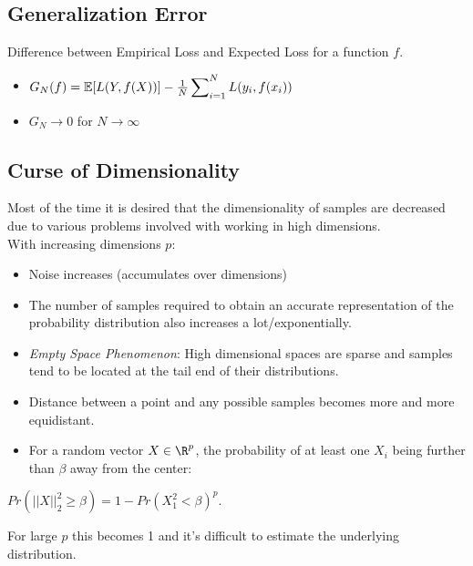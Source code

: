 \documentclass[english]{latex4ei/latex4ei_sheet}
\begin{document}
\begin{sectionbox}

\subsection{Generalization Error}
Difference between Empirical Loss and Expected Loss for a function $f$.
\begin{itemize}
    \item $G_N(f)=\mathbb{E}[L(Y,f(X))]-\frac{1}{N}\sideset{}{_{i=1}^N}\sum L(y_i,f(x_i))$
    \item $G_N \to 0$ for $N\to \infty$
\end{itemize}

\subsection{Curse of Dimensionality}
Most of the time it is desired that the dimensionality of samples are decreased due to various problems involved with working in high dimensions.\\
With increasing dimensions $p$:
\begin{itemize}
    \item Noise increases (accumulates over dimensions)
    \item The number of samples required to obtain an accurate representation of the probability distribution also increases a lot/exponentially.
    \item \emph{Empty Space Phenomenon}: High dimensional spaces are sparse and samples tend to be located at the tail end of their distributions.
    \item Distance between a point and any possible samples becomes more and more equidistant.
    \item For a random vector $X\in\R^p$, the probability of at least one $X_i$ being further than $\beta$ away from the center:
    \end{itemize}
    \begin{emphbox}
    $Pr(||X||^2_2\ge\beta)=1-Pr(X_1^2<\beta)^p$. 
    \end{emphbox}
    For large $p$ this becomes 1 and it's difficult to estimate the underlying distribution.\\


\end{sectionbox}
\end{document}
